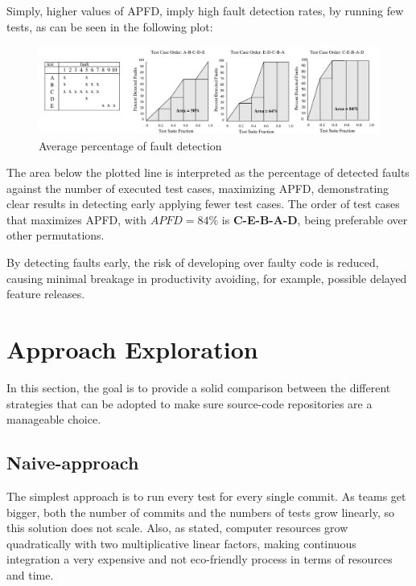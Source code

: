 Simply, higher values of APFD, imply high fault detection rates, by running few tests, as can be seen in the following plot:

\begin{figure}[h]
	\centering
	\includegraphics[scale=0.5, width=\linewidth]{figures/APFD.png}
	\caption{Average percentage of fault detection \cite{APFD}}
	\label{APFD}
\end{figure} 

The area below the plotted line is interpreted as the percentage of detected faults against the number of executed test cases, maximizing APFD, demonstrating clear results in detecting early applying fewer test cases. The order of test cases that maximizes APFD, with $ APFD = 84 \%$ is \textbf{C-E-B-A-D}, being preferable over other permutations.

By detecting faults early, the risk of developing over faulty code is reduced, causing minimal breakage in productivity avoiding, for example, possible delayed feature releases.\cite{Uber}

\section{Approach Exploration}

In this section, the goal is to provide a solid comparison between the different strategies that can be adopted to make sure source-code repositories are a manageable choice.


\subsection{Naive-approach}

The simplest approach is to run every test for every single commit. As teams get bigger,  both the number of commits and the numbers of tests grow linearly, so this solution does not scale. Also, as \cite{Memon:2017:TGC:3103112.3103143} stated, computer resources grow quadratically with two multiplicative linear factors, making continuous integration a very expensive and not eco-friendly process in terms of resources and time.

